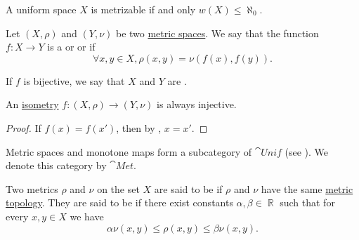 \begin{theorem}\label{thm:countable_uniform_base_implies_metrizable}
  A uniform space \( X \) is metrizable if and only \( w(X) \leq \aleph_0 \).
\end{theorem}

\medskip

\begin{definition}\label{def:isometry}
  Let \( (X, \rho) \) and \( (Y, \nu) \) be two \hyperref[def:metric_space]{metric spaces}. We say that the function \( f: X \to Y \) is a  or  or  if
  \begin{equation*}
    \forall x, y \in X, \rho(x, y) = \nu(f(x), f(y)).
  \end{equation*}

  If \( f \) is bijective, we say that \( X \) and \( Y \) are .
\end{definition}

\begin{proposition}\label{thm:isometry_is_injective}
  An \hyperref[def:isometry]{isometry} \( f: (X, \rho) \to (Y, \nu) \) is always injective.
\end{proposition}
\begin{proof}
  If \( f(x) = f(x') \), then by , \( x = x' \).
\end{proof}

\begin{definition}\label{def:category_of_metric_spaces}
  Metric spaces and monotone maps form a subcategory of \( \cat{Unif} \) (see ). We denote this category by \( \cat{Met} \).
\end{definition}

\begin{definition}\label{def:equivalent_metrics}
  Two metrics \( \rho \) and \( \nu \) on the set \( X \) are said to be  if \( \rho \) and \( \nu \) have the same \hyperref[def:metric_topology]{metric topology}. They are said to be  if there exist constants \( \alpha, \beta \in \BbbR \) such that for every \( x, y \in X \) we have
  \begin{equation*}
    \alpha \nu(x, y) \leq \rho(x, y) \leq \beta \nu(x, y).
  \end{equation*}
\end{definition}

